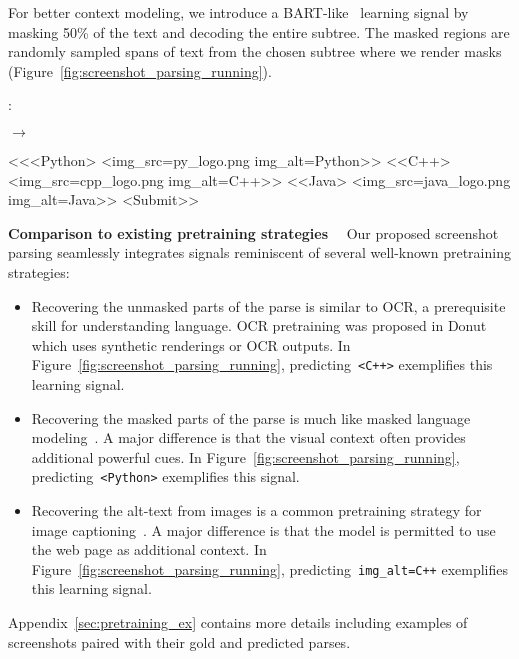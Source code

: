 \documentclass{article} \usepackage[accepted]{icml2023}
\newenvironment{code}{\snugshade\verbatim}{\endverbatim\endsnugshade}
\begin{document}
For better context modeling, we introduce a BART-like~\citep{lewis-etal-2020-bart} learning signal by masking 50\% of the text and decoding the entire subtree. The masked regions are randomly sampled spans of text from the chosen subtree where we render masks (Figure~\ref{fig:screenshot_parsing_running}).

\begin{figure*}[t!]
\centering
\begin{minipage}{.18\textwidth}
\end{minipage}
\begin{minipage}{.05\textwidth}
\centering
\large
:
\end{minipage}
\begin{minipage}{.18\textwidth}
\end{minipage}
\begin{minipage}{.05\textwidth}
\centering
\large
$\rightarrow$
\end{minipage}
\begin{minipage}{.35\textwidth}
\scriptsize
\begin{code}
<<<Python>
  <img_src=py_logo.png img_alt=Python>>
 <<C++>
  <img_src=cpp_logo.png img_alt=C++>>
 <<Java>
  <img_src=java_logo.png img_alt=Java>>
 <Submit>>
\end{code}
\end{minipage}
\caption{Toy illustration of input-output pairs (right) sampled from the original web page (left).}
\label{fig:screenshot_parsing_running}
\end{figure*}
\textbf{Comparison to existing pretraining strategies}~~
Our proposed screenshot parsing seamlessly integrates signals reminiscent of several well-known pretraining strategies:
\begin{itemize}[leftmargin=12pt,itemsep=4pt,topsep=0pt,parsep=0pt,partopsep=0pt]
    \item Recovering the unmasked parts of the parse is similar to OCR, a prerequisite skill for understanding language. OCR pretraining was proposed in Donut which uses synthetic renderings or OCR outputs.
    In Figure~\ref{fig:screenshot_parsing_running}, predicting~\texttt{<C++>} exemplifies this learning signal. 
    \item Recovering the masked parts of the parse is much like masked language modeling~\citep{bert}. A major difference is that the visual context often provides additional powerful cues. In Figure~\ref{fig:screenshot_parsing_running}, predicting~\texttt{<Python>} exemplifies this signal.
    \item Recovering the alt-text from images is a common pretraining strategy for image captioning~\citep{conceptual-captions, wang2022git, pali}. A major difference is that the model is permitted to use the web page as additional context. In Figure~\ref{fig:screenshot_parsing_running}, predicting~\texttt{img\_alt=C++} exemplifies this learning signal.
\end{itemize}
Appendix~\ref{sec:pretraining_ex} contains more details including examples of screenshots paired with their gold and predicted parses.
\end{document}
